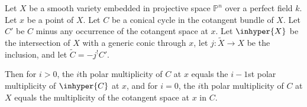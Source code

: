 \begin{lemma}
\notready\label{multiplicity-hypersurface}  Let $X$ be a smooth variety embedded in projective space $\mathbb P^n$ over a perfect field $k$. Let $x$ be a point of $X$. Let $C$ be a conical cycle in the cotangent bundle of $X$.  Let $C'$ be $C$ minus any occurrence of the cotangent space at $x$.  Let $\inhyper{X}$ be the intersection of $X$ with a generic conic through $x$, let $j: \tilde{X} \to X$ be the inclusion, and let $\tilde{C} =-  j^{!} C'$.


Then for $i>0$, the $i$th polar multiplicity of $C$ at $x$ equals the $i-1$st polar multiplicity of $\inhyper{C}$ at $x$, and for $i=0$, the $i$th polar multiplicity of $C$ at $X$ equals the multiplicity of the cotangent space at $x$ in $C$. \end{lemma}


